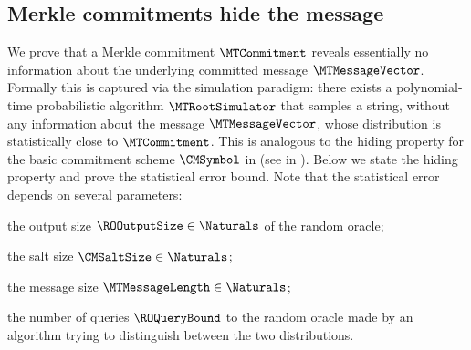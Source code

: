 \subsection{Merkle commitments hide the message}
\label{section:merkle-commitment-hiding-1}

We prove that a Merkle commitment $\MTCommitment$ reveals essentially no information about the underlying committed message $\MTMessageVector$. Formally this is captured via the simulation paradigm: there exists a polynomial-time probabilistic algorithm $\MTRootSimulator$ that samples a string, without any information about the message $\MTMessageVector$, whose distribution is statistically close to $\MTCommitment$. This is analogous to the hiding property for the basic commitment scheme $\CMSymbol$ in  (see  in ). Below we state the hiding property and prove the statistical error bound. Note that the statistical error depends on several parameters:
\begin{inparaenum}[(a)]
  \item the output size $\ROOutputSize \in \Naturals$ of the random oracle;
  \item the salt size $\CMSaltSize \in \Naturals$;
  \item the message size $\MTMessageLength \in \Naturals$;
  \item the number of queries $\ROQueryBound$ to the random oracle made by an algorithm trying to distinguish between the two distributions.
\end{inparaenum}

